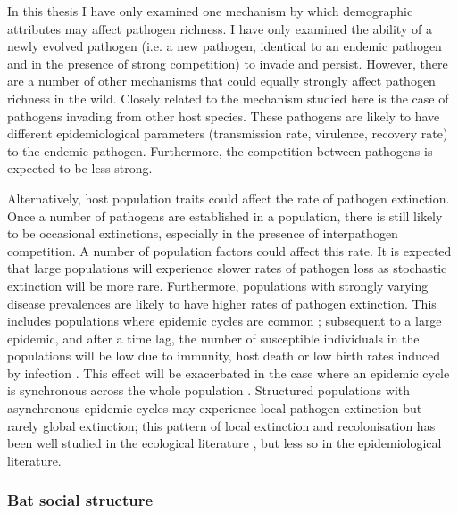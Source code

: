 In this thesis I have only examined one mechanism by which demographic attributes may affect pathogen richness.
I have only examined the ability of a newly evolved pathogen (i.e. a new pathogen, identical to an endemic pathogen and in the presence of strong competition) to invade and persist.
However, there are a number of other mechanisms that could equally strongly affect pathogen richness in the wild.
Closely related to the mechanism studied here is the case of pathogens invading from other host species.
These pathogens are likely to have different epidemiological parameters (transmission rate, virulence, recovery rate) to the endemic pathogen.
Furthermore, the competition between pathogens is expected to be less strong.

Alternatively, host population traits could affect the rate of pathogen extinction.
Once a number of pathogens are established in a population, there is still likely to be occasional extinctions, especially in the presence of interpathogen competition.
A number of population factors could affect this rate.
It is expected that large populations will experience slower rates of pathogen loss as stochastic extinction will be more rare.
Furthermore, populations with strongly varying disease prevalences are likely to have higher rates of pathogen extinction.
This includes populations where epidemic cycles are common \cite{altizer2006sesonality}; subsequent to a large epidemic, and after a time lag, the number of susceptible individuals in the populations will be low due to immunity, host death or low birth rates induced by infection \cite{scott1987population, hethcote1994thousand}.
This effect will be exacerbated in the case where an epidemic cycle is synchronous across the whole population \cite{duke2011strong}.
Structured populations with asynchronous epidemic cycles may experience local pathogen extinction but rarely global extinction; this pattern of local extinction and recolonisation has been well studied in the ecological literature \cite{grenfell1995seasonality, levin1974dispersion, hanski1998metapopulation}, but less so in the epidemiological literature. %


\subsubsection{Bat social structure}

